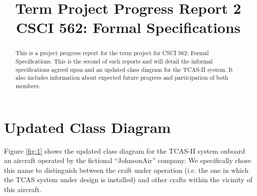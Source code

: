 \documentclass[conference]{IEEEtran}
\begin{document}
\title{Term Project Progress Report 2\\
CSCI 562: Formal Specifications\\ }

\author{
\and
{}
}

\maketitle

\begin{abstract}
This is a project progress report for the term project for CSCI 562: Formal Specifications. This is the second of such reports and will detail the informal specifications agreed upon and an updated class diagram for the TCAS-II system. It also includes information about expected future progress and participation of both members.
\end{abstract}

\section{Updated Class Diagram}
Figure \ref{fig:1} shows the updated class diagram for the TCAS-II system onboard an aircraft operated by the fictional ``JohnsonAir'' company. We specifically chose this name to distinguish between the craft under operation (i.e. the one in which the TCAS system under design is installed) and other crafts within the vicinity of this aircraft.
\end{document}
